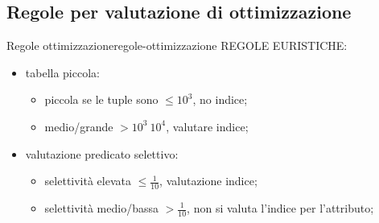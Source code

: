 \documentclass[12pt]{article}
\begin{document}
\subsection{Regole per valutazione di ottimizzazione}

\begin{theorem}{Regole ottimizzazione}{regole-ottimizzazione}
    REGOLE EURISTICHE:
    \begin{itemize}
        \item tabella piccola:
            \begin{itemize}
                \item piccola se le tuple sono $ \leqslant10^{3}$, no indice;
                \item medio/grande $ > 10^{3} ~ 10^{4}$, valutare indice;
            \end{itemize}
        \item valutazione predicato selettivo:
            \begin{itemize}
                \item selettivit\`a elevata $ \leqslant \frac{1}{10}$, valutazione indice;
                \item selettivit\`a medio/bassa $ > \frac{1}{10} $, non si valuta l'indice per l'attributo;
            \end{itemize}
    \end{itemize}


\end{theorem}
\end{document}
